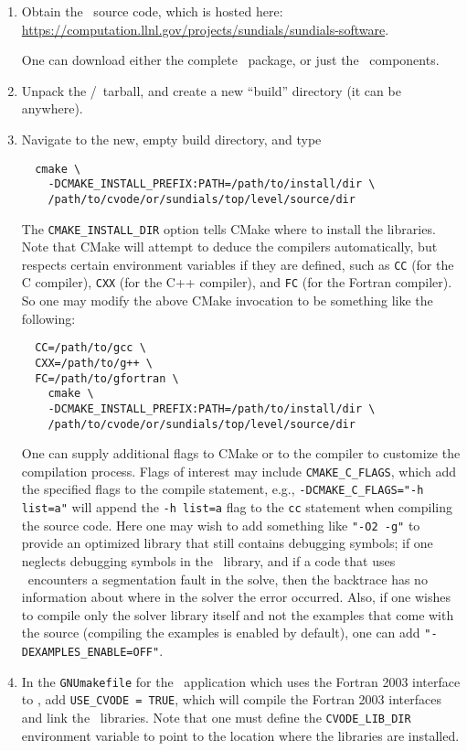 \begin{enumerate}

  \item Obtain the \cvode\ source code, which is hosted here: \url{https://computation.llnl.gov/projects/sundials/sundials-software}.

  One can download either the complete \sundials\ package, or just the \cvode\ components.

  \item Unpack the \cvode/\sundials\ tarball, and create a new ``build'' directory (it can be anywhere).

  \item Navigate to the new, empty build directory, and type

  \begin{verbatim}
  cmake \
    -DCMAKE_INSTALL_PREFIX:PATH=/path/to/install/dir \
    /path/to/cvode/or/sundials/top/level/source/dir
  \end{verbatim}

  The \texttt{CMAKE\_INSTALL\_DIR} option tells CMake where to install the libraries.
  Note that CMake will attempt to deduce the compilers automatically, but respects certain environment variables if they are defined, such as \texttt{CC} (for the C compiler), \texttt{CXX} (for the C++ compiler), and \texttt{FC} (for the Fortran compiler).
  So one may modify the above CMake invocation to be something like the following:

  \begin{verbatim}
  CC=/path/to/gcc \
  CXX=/path/to/g++ \
  FC=/path/to/gfortran \
    cmake \
    -DCMAKE_INSTALL_PREFIX:PATH=/path/to/install/dir \
    /path/to/cvode/or/sundials/top/level/source/dir
  \end{verbatim}

  One can supply additional flags to CMake or to the compiler to customize the compilation process. 
  Flags of interest may include \texttt{CMAKE\_C\_FLAGS}, which add the specified flags to the compile statement, e.g.,
  \texttt{-DCMAKE\_C\_FLAGS="-h list=a"} will append the \texttt{-h list=a} flag to the \texttt{cc} statement when compiling the source code.
  Here one may wish to add something like \texttt{"-O2 -g"} to provide an optimized library that still contains debugging symbols; 
  if one neglects debugging symbols in the \cvode\ library, and if a code that uses \cvode\ encounters a segmentation fault in the solve, 
  then the backtrace has no information about where in the solver the error occurred.
  Also, if one wishes to compile only the solver library itself and not the examples that come with the source 
  (compiling the examples is enabled by default), one can add \texttt{"-DEXAMPLES\_ENABLE=OFF"}.

  \item In the \texttt{GNUmakefile} for the \amrex\ application which uses the Fortran 2003 interface to \cvode, add \texttt{USE\_CVODE = TRUE}, which will compile the Fortran 2003 interfaces and link the \cvode\ libraries.
  Note that one must define the \texttt{CVODE\_LIB\_DIR} environment variable to point to the location where the libraries are installed.
\end{enumerate}


